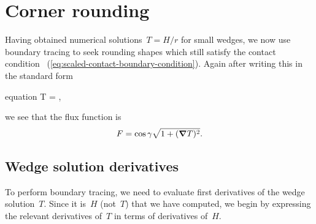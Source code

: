 \begin{figure}
\end{figure}

\section{Corner rounding}
\label{sec:small.rounding}

Having obtained numerical solutions~$T = H / r$ for small wedges,
we now use boundary tracing to seek rounding shapes
which still satisfy the contact condition~%
  (\ref{eq:scaled-contact-boundary-condition}).
Again after writing this in the standard form
\begin{important}{equation}
  \normalvec \dotp \del T = \cos\gamma {},
  \label{eq:small-flux-boundary-condition}
\end{important}
we see that the flux function is
\begin{equation}
  F = \cos\gamma \sqrt{1 + (\mathop{}\!\boldsymbol{\mathbf{\nabla}} T)^2}.
  \label{eq:small-flux-function}
\end{equation}

\subsection{Wedge solution derivatives}
\label{sec:small.rounding.derivatives}

To perform boundary tracing,
we need to evaluate first derivatives of the wedge solution~$T$.
Since it is~$H$ (not~$T$) that we have computed,
we begin by expressing the relevant derivatives of~$T$
in terms of derivatives of~$H$.

